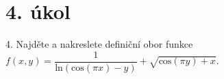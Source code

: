 \section{4. úkol}
  4. Najděte a nakreslete definiční obor funkce $f(x,y) = \dfrac{1}{\mathrm{ln}(\mathrm{cos}(\pi x) - y)} + \sqrt{\mathrm{cos}(\pi y) + x}$.
